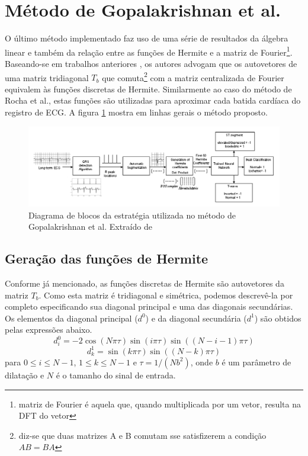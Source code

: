 
\section{Método de Gopalakrishnan et al.}
\label{sec:section4}
O último método implementado faz uso de uma série de resultados da álgebra linear e também da relação entre as funções de Hermite e a matriz de Fourier\footnote{matriz de Fourier é aquela que, quando multiplicada por um vetor, resulta na DFT do vetor}. Baseando-se em trabalhos anteriores \cite{Mugler02}, os autores advogam que os autovetores de uma matriz tridiagonal $T_b$ que comuta\footnote{diz-se que duas matrizes A e B comutam sse satisfizerem a condição $AB = BA$} com a matriz centralizada de Fourier equivalem às funções discretas de Hermite. Similarmente ao caso do método de Rocha et al., estas funções são utilizadas para aproximar cada batida cardíaca do registro de ECG. A figura \ref{fig:gopalak_01} mostra em linhas gerais o método proposto.

\begin{figure}[ht]
    \centering
    \includegraphics[width=1.0\textwidth]{figures/gopalak_01.png}
    \caption{Diagrama de blocos da estratégia utilizada no método de Gopalakrishnan et al. Extraído de \cite{Gopalak04}}
    \label{fig:gopalak_01}
\end{figure}

\subsection{Geração das funções de Hermite}
Conforme já mencionado, as funções discretas de Hermite são autovetores da matriz $T_b$. Como esta matriz é tridiagonal e simétrica, podemos descrevê-la por completo especificando sua diagonal principal e uma das diagonais secundárias. Os elementos da diagonal principal ($d^0$) e da diagonal secundária ($d^1$) são obtidos pelas expressões abaixo.
\begin{equation} \label{equ:main_diagonal}
    d^0_{i} = -2\cos(N\pi\tau)\sin(i\pi\tau)\sin((N-i-1)\pi\tau)
\end{equation}
\begin{equation} \label{equ:off_diagonal}
    d^1_{k} = \sin(k\pi\tau)\sin((N-k)\pi\tau)
\end{equation}
para $0\leq i\leq N-1$, $1\leq k\leq N-1$ e $\tau = 1/(Nb^2)$, onde $b$ é um parâmetro de dilatação e $N$ é o tamanho do sinal de entrada.

